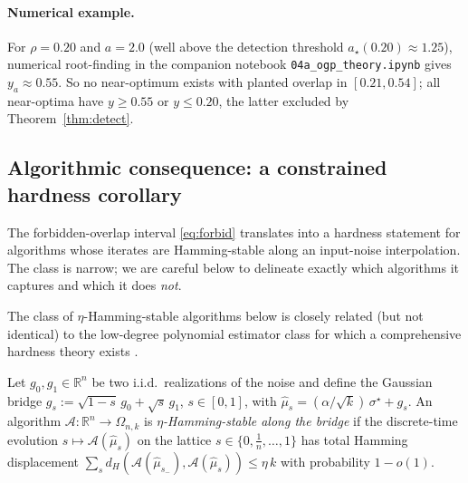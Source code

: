 \paragraph{Numerical example.} For $\rho=0.20$ and $a = 2.0$ (well above the detection
threshold $a_\star(0.20)\approx 1.25$), numerical root-finding in the companion notebook
\texttt{04a\_ogp\_theory.ipynb} gives $y_a\approx 0.55$. So no near-optimum exists with
planted overlap in $[0.21, 0.54]$; all near-optima have $y\geq 0.55$ or $y\leq 0.20$, the
latter excluded by Theorem~\ref{thm:detect}.

\subsection{Algorithmic consequence: a constrained hardness corollary}\label{ssec:cor-scope}

The forbidden-overlap interval \eqref{eq:forbid} translates into a hardness statement for
algorithms whose iterates are Hamming-stable along an input-noise interpolation. The class
is narrow; we are careful below to delineate exactly which algorithms it captures and
which it does \emph{not}.

The class of $\eta$-Hamming-stable algorithms below is closely related (but not identical)
to the low-degree polynomial estimator class for which a comprehensive hardness theory exists
\cite{gamarnik-jagannath-wein}.

\begin{definition}\label{def:stable}
Let $g_0,g_1\in\mathbb R^n$ be two i.i.d.\ realizations of the noise and define the
Gaussian bridge $g_s := \sqrt{1-s}\,g_0 + \sqrt{s}\,g_1$, $s\in[0,1]$, with
$\hat\mu_s = (\alpha/\sqrt k)\,\sigma^\star + g_s$. An algorithm
$\mathcal A:\mathbb R^n\to\Omega_{n,k}$ is \emph{$\eta$-Hamming-stable along the bridge}
if the discrete-time evolution $s\mapsto\mathcal A(\hat\mu_s)$ on the lattice
$s\in\{0,\tfrac1n,\dots,1\}$ has total Hamming displacement
$\sum_{s} d_H(\mathcal A(\hat\mu_{s_-}),\mathcal A(\hat\mu_s)) \le \eta\,k$
with probability $1-o(1)$.
\end{definition}

